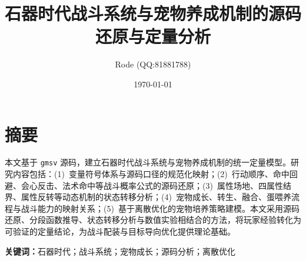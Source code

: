 \documentclass[12pt,openany]{ctexbook}
\title{石器时代战斗系统与宠物养成机制的源码还原与定量分析}
\author{Rode (QQ:81881788)}
\date{\today}
\theoremstyle{definition}
\theoremstyle{remark}
\DeclareRobustCommand{\code}[1]{\ifmmode\text{\nolinkurl{#1}}\else\nolinkurl{#1}\fi}
\begin{document}
\frontmatter
\maketitle

\chapter*{摘要}
本文基于 \code{gmsv} 源码，建立石器时代战斗系统与宠物养成机制的统一定量模型。研究内容包括：(1)~变量符号体系与源码口径的规范化映射；(2)~行动顺序、命中回避、会心反击、法术命中等战斗概率公式的源码还原；(3)~属性场地、四属性结界、属性反转等动态机制的状态转移分析；(4)~宠物成长、转生、融合、蛋喂养流程与战斗能力的映射关系；(5)~基于离散优化的宠物培养策略建模。本文采用源码还原、分段函数推导、状态转移分析与数值实验相结合的方法，将玩家经验转化为可验证的定量结论，为战斗配装与目标导向优化提供理论基础。

\vspace{1em}
\noindent\textbf{关键词：}石器时代；战斗系统；宠物成长；源码分析；离散优化

\tableofcontents

\mainmatter














\appendix



\end{document}
